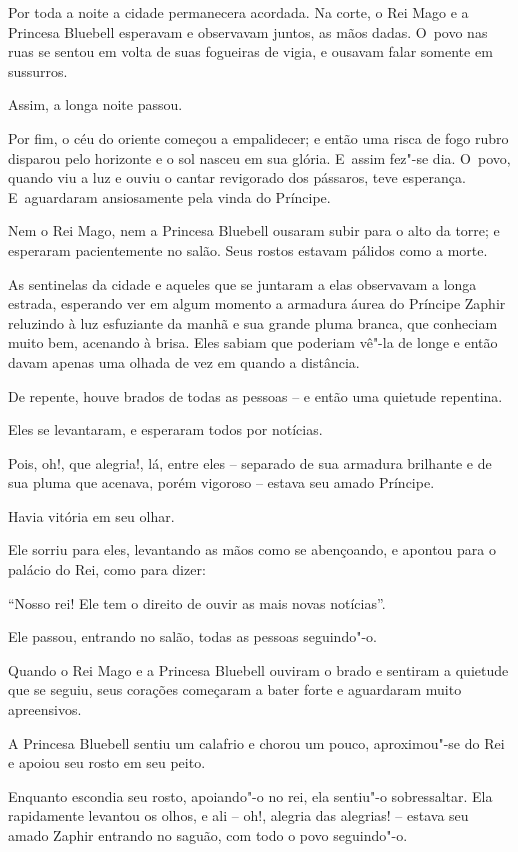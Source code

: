 Por toda a noite a cidade permanecera acordada. Na corte, o Rei Mago e a
Princesa Bluebell esperavam e observavam juntos, as mãos dadas. O~povo
nas ruas se sentou em volta de suas fogueiras de vigia, e ousavam falar
somente em sussurros.

Assim, a longa noite passou.

Por fim, o céu do oriente começou a empalidecer; e então uma risca de
fogo rubro disparou pelo horizonte e o sol nasceu em sua glória. E~assim
fez"-se dia. O~povo, quando viu a luz e ouviu o cantar revigorado dos
pássaros, teve esperança. E~aguardaram ansiosamente pela vinda do
Príncipe.

Nem o Rei Mago, nem a Princesa Bluebell ousaram subir para o alto da
torre; e esperaram pacientemente no salão. Seus rostos estavam pálidos
como a morte.

As sentinelas da cidade e aqueles que se juntaram a elas observavam a
longa estrada, esperando ver em algum momento a armadura áurea do
Príncipe Zaphir reluzindo à luz esfuziante da manhã e sua grande pluma
branca, que conheciam muito bem, acenando à brisa. Eles sabiam que
poderiam vê"-la de longe e então davam apenas uma olhada de vez em quando
a distância.

De repente, houve brados de todas as pessoas -- e então uma quietude
repentina.

Eles se levantaram, e esperaram todos por notícias.

Pois, oh!, que alegria!, lá, entre eles -- separado de sua armadura
brilhante e de sua pluma que acenava, porém vigoroso -- estava seu amado
Príncipe.

Havia vitória em seu olhar.

Ele sorriu para eles, levantando as mãos como se abençoando, e apontou
para o palácio do Rei, como para dizer:

``Nosso rei! Ele tem o direito de ouvir as mais novas notícias''.

Ele passou, entrando no salão, todas as pessoas seguindo"-o.

Quando o Rei Mago e a Princesa Bluebell ouviram o brado e sentiram a
quietude que se seguiu, seus corações começaram a bater forte e
aguardaram muito apreensivos.

A Princesa Bluebell sentiu um calafrio e chorou um pouco, aproximou"-se
do Rei e apoiou seu rosto em seu peito.

Enquanto escondia seu rosto, apoiando"-o no rei, ela sentiu"-o
sobressaltar. Ela rapidamente levantou os olhos, e ali -- oh!, alegria
das alegrias! -- estava seu amado Zaphir entrando no saguão, com todo o
povo seguindo"-o.

